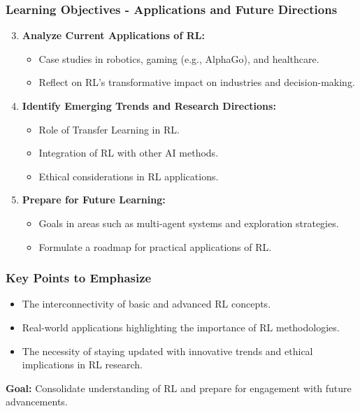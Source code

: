 \documentclass[aspectratio=169]{beamer}
\begin{document}
\begin{frame}[fragile]
    \frametitle{Learning Objectives - Applications and Future Directions}
    \begin{enumerate}
        \setcounter{enumi}{2}
        \item \textbf{Analyze Current Applications of RL:}
            \begin{itemize}
                \item Case studies in robotics, gaming (e.g., AlphaGo), and healthcare.
                \item Reflect on RL's transformative impact on industries and decision-making.
            \end{itemize}
        \item \textbf{Identify Emerging Trends and Research Directions:}
            \begin{itemize}
                \item Role of Transfer Learning in RL.
                \item Integration of RL with other AI methods.
                \item Ethical considerations in RL applications.
            \end{itemize}
        \item \textbf{Prepare for Future Learning:}
            \begin{itemize}
                \item Goals in areas such as multi-agent systems and exploration strategies.
                \item Formulate a roadmap for practical applications of RL.
            \end{itemize}
    \end{enumerate}
\end{frame}

\begin{frame}[fragile]
    \frametitle{Key Points to Emphasize}
    \begin{itemize}
        \item The interconnectivity of basic and advanced RL concepts.
        \item Real-world applications highlighting the importance of RL methodologies.
        \item The necessity of staying updated with innovative trends and ethical implications in RL research.
    \end{itemize}
    \textbf{Goal:} Consolidate understanding of RL and prepare for engagement with future advancements.
\end{frame}
\end{document}
